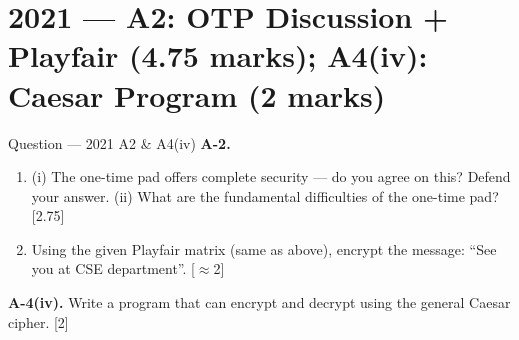 \documentclass[12pt,a4paper]{article}
\begin{document}
\newpage
\section{2021 --- A2: OTP Discussion + Playfair (4.75 marks); A4(iv): Caesar Program (2 marks)}

\begin{qbox}{Question --- 2021 A2 \& A4(iv)}
\textbf{A-2.}
\begin{enumerate}[label=(\alph*)]
  \item[(a)] (i) The one-time pad offers complete security --- do you agree on this? Defend your answer. (ii) What are the fundamental difficulties of the one-time pad? \hfill [2.75]
  \item[(b)] Using the given Playfair matrix (same as above), encrypt the message: ``See you at CSE department''. \hfill [$\approx$2]
\end{enumerate}
\textbf{A-4(iv).} Write a program that can encrypt and decrypt using the general Caesar cipher. \hfill [2]
\end{qbox}
\end{document}
